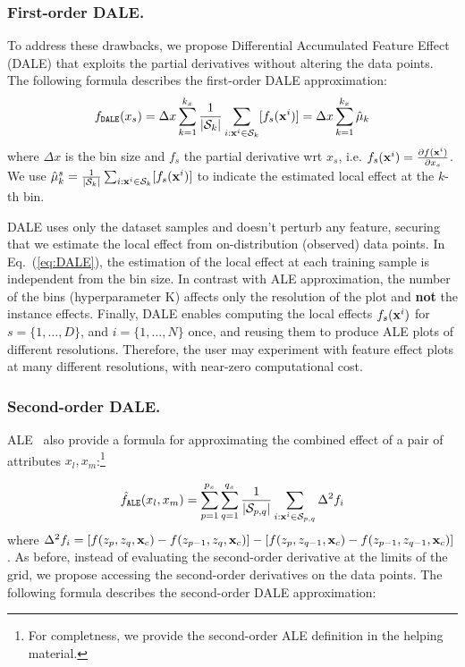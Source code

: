 \subsubsection{First-order DALE.}
%
To address these drawbacks, we propose Differential Accumulated
Feature Effect (DALE) that exploits the partial derivatives without
altering the data points. The following formula describes the
first-order DALE approximation:
%
\begin{equation}
  f_{\mathtt{DALE}}(x_s) = \Delta x \sum_{k=1}^{k_x} \frac{1}{|\mathcal{S}_k|} \sum_{i:\mathbf{x}^i \in \mathcal{S}_k} [f_s(\mathbf{x}^i)] = \Delta x \sum_{k=1}^{k_x} \hat{\mu}_k
 \label{eq:DALE}
\end{equation}
%
where \(\Delta x\) is the bin size and \(f_s\) the partial derivative
wrt \(x_s\), i.e.
\(f_s(\mathbf{x}^i) = \frac{\partial f(\mathbf{x}^i)}{\partial x_s}\). We use
\(\hat{\mu}_k^s = \frac{1}{|\mathcal{S}_k|} \sum_{i:\mathbf{x}^i \in
  \mathcal{S}_k} [f_s(\mathbf{x}^i)]\) to indicate the estimated local effect
at the \(k\)-th bin.

DALE uses only the dataset samples and doesn't perturb any feature,
securing that we estimate the local effect from on-distribution
(observed) data points. In Eq.~(\ref{eq:DALE}), the estimation of the
local effect at each training sample is independent from the bin
size. In contrast with ALE approximation, the number of the bins
(hyperparameter K) affects only the resolution of the plot and
\textbf{not} the instance effects. Finally, DALE enables computing the
local effects \( f_s(\mathbf{x}^i) \) for \(s = \{1, \ldots, D \}\), and
\(i = \{1, \ldots, N \}\) once, and reusing them to produce ALE plots
of different resolutions.  Therefore, the user may experiment with
feature effect plots at many different resolutions, with near-zero
computational cost.

\subsubsection{Second-order DALE.}

ALE~\cite{Apley2020} also provide a formula for approximating the
combined effect of a pair of attributes \(x_l, x_m\):\footnote{For
  completness, we provide the second-order ALE definition in the
  helping material.}

\begin{equation}
  \label{eq:ALE2approx}
  \hat{f}_{\mathtt{ALE}}(x_l, x_m) =
  \sum_{p=1}^{p_x}
  \sum_{q=1}^{q_x} \frac{1}{|\mathcal{S}_{p,q}|}
  \sum_{i:\mathbf{x}^i \in \mathcal{S}_{p,q}} \Delta^2 f_i
\end{equation}
%
where
\( \Delta^2 f_i = [f(z_p, z_q, \mathbf{x}_c) - f(z_{p-1}, z_q, \mathbf{x}_c)] - [f(z_p,
z_{q-1}, \mathbf{x}_c) - f(z_{p-1}, z_{q-1}, \mathbf{x}_c)] \). As before, instead of
evaluating the second-order derivative at the limits of the grid, we
propose accessing the second-order derivatives on the data points. The
following formula describes the second-order DALE approximation:

